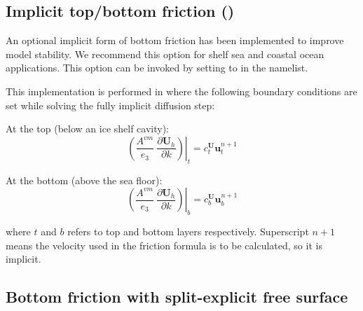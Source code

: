 \documentclass[../main/NEMO_manual]{subfiles}
\begin{document}
\subsection[Implicit top/bottom friction (\forcode{ln_drgimp=.true.})]{Implicit top/bottom friction (\protect{})}
\label{subsec:ZDF_drg_imp}

An optional implicit form of bottom friction has been implemented to improve model stability.
We recommend this option for shelf sea and coastal ocean applications. %
This option can be invoked by setting  to  in the  namelist.

This implementation is performed in  where the following boundary conditions are set while solving the fully implicit diffusion step:

At the top (below an ice shelf cavity):
\[
  \left.{\left( {\frac{A^{vm} }{e_3 }\ \frac{\partial \textbf{U}_h}{\partial k}} \right)} \right|_{t}
  = c_{t}^{\textbf{U}}\textbf{u}^{n+1}_{t}
\]

At the bottom (above the sea floor):
\[
  \left.{\left( {\frac{A^{vm} }{e_3 }\ \frac{\partial \textbf{U}_h}{\partial k}} \right)} \right|_{b}
  = c_{b}^{\textbf{U}}\textbf{u}^{n+1}_{b}
\]

where $t$ and $b$ refers to top and bottom layers respectively.
Superscript $n+1$ means the velocity used in the friction formula is to be calculated, so it is implicit.

\subsection[Bottom friction with split-explicit free surface]{Bottom friction with split-explicit free surface}
\label{subsec:ZDF_drg_ts}
\end{document}
